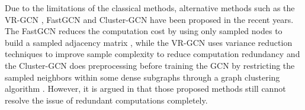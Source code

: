 Due to the limitations of the classical methods, alternative methods such as the VR-GCN \cite{chen2017stochastic}, FastGCN \cite{chen2018fastgcn} and Cluster-GCN \cite{chiang2019cluster} have been proposed in the recent years. The FastGCN reduces the computation cost by using only sampled nodes to build a sampled adjacency matrix \cite{chen2018fastgcn}, while the VR-GCN uses variance
reduction techniques to improve sample complexity to reduce computation redundancy \cite{chen2017stochastic} and the Cluster-GCN does preprocessing before training the GCN by restricting the sampled neighbors within some dense subgraphs through a graph clustering algorithm \cite{chiang2019cluster}. However, it is argued in \cite{assigned_paper_zou2019layer} that those proposed methods still cannot resolve the issue of redundant
computations completely.

